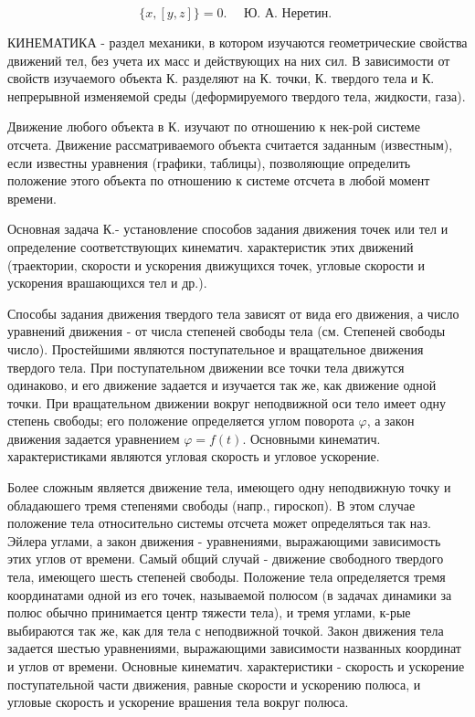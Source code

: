 \documentclass[10pt]{article}
\begin{document}
\[

\{x,[y, z]\}=0 . \quad \text { Ю. А. Неретин. }

\]



КИНЕМАТИКА - раздел механики, в котором изучаются геометрические свойства движений тел, без учета их масс и действующих на них сил. В зависимости от свойств изучаемого объекта К. разделяют на К. точки, К. твердого тела и К. непрерывной изменяемой среды (деформируемого твердого тела, жидкости, газа).



Движение любого объекта в К. изучают по отношению к нек-рой системе отсчета. Движение рассматриваемого объекта считается заданным (известным), если известны уравнения (графики, таблицы), позволяющие определить положение этого объекта по отношению к системе отсчета в любой момент времени.



Основная задача К.- установление способов задания движения точек или тел и определение соответствующих кинематич. характеристик этих движений (траектории, скорости и ускорения движущихся точек, угловые скорости и ускорения врашающихся тел и др.).



Способы задания движения твердого тела зависят от вида его движения, а число уравнений движения - от числа степеней свободы тела (см. Степеней свободы число). Простейшими являются поступательное и вращательное движения твердого тела. При поступательном движении все точки тела движутся одинаково, и его движение задается и изучается так же, как движение одной точки. При вращательном движении вокруг неподвижной оси тело имеет одну степень свободы; его положение определяется углом поворота $\varphi$, а закон движения задается уравнением $\varphi=f(t)$. Основными кинематич. характеристиками являются угловая скорость и угловое ускорение.



Более сложным является движение тела, имеющего одну неподвижную точку и обладаюшего тремя степенями свободы (напр., гироскоп). В этом случае положение тела относительно системы отсчета может определяться так наз. Эйлера углами, а закон движения - уравнениями, выражающими зависимость этих углов от времени. Самый общий случай - движение свободного твердого тела, имеющего шесть степеней свободы. Положение тела определяется тремя координатами одной из его точек, называемой полюсом (в задачах динамики за полюс обычно принимается центр тяжести тела), и тремя углами, к-рые выбираются так же, как для тела с неподвижной точкой. Закон движения тела задается шестью уравнениями, выражающими зависимости названных координат и углов от времени. Основные кинематич. характеристики - скорость и ускорение поступательной части движения, равные скорости и ускорению полюса, и угловые скорость и ускорение врашения тела вокруг полюса.
\end{document}
